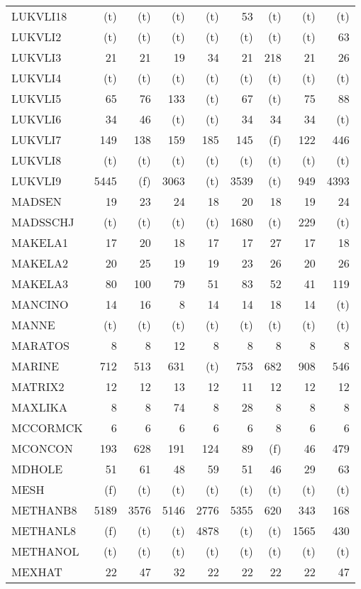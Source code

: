 \documentclass[11pt,twoside]{article}
\begin{document}
{\begin{longtable}[c]{|l|r|r|r|r|r|r|r|r|}
 LUKVLI18 & (t) & (t) & (t) & (t) & 53 & (t) & (t) & (t) \\
 LUKVLI2 & (t) & (t) & (t) & (t) & (t) & (t) & (t) & 63 \\
 LUKVLI3 & 21 & 21 & 19 & 34 & 21 & 218 & 21 & 26 \\
 LUKVLI4 & (t) & (t) & (t) & (t) & (t) & (t) & (t) & (t) \\
 LUKVLI5 & 65 & 76 & 133 & (t) & 67 & (t) & 75 & 88 \\
 LUKVLI6 & 34 & 46 & (t) & (t) & 34 & 34 & 34 & (t) \\
 LUKVLI7 & 149 & 138 & 159 & 185 & 145 & (f) & 122 & 446 \\
 LUKVLI8 & (t) & (t) & (t) & (t) & (t) & (t) & (t) & (t) \\
 LUKVLI9 & 5445 & (f) & 3063 & (t) & 3539 & (t) & 949 & 4393 \\
 MADSEN & 19 & 23 & 24 & 18 & 20 & 18 & 19 & 24 \\
 MADSSCHJ & (t) & (t) & (t) & (t) & 1680 & (t) & 229 & (t) \\
 MAKELA1 & 17 & 20 & 18 & 17 & 17 & 27 & 17 & 18 \\
 MAKELA2 & 20 & 25 & 19 & 19 & 23 & 26 & 20 & 26 \\
 MAKELA3 & 80 & 100 & 79 & 51 & 83 & 52 & 41 & 119 \\
 MANCINO & 14 & 16 & 8 & 14 & 14 & 18 & 14 & (t) \\
 MANNE & (t) & (t) & (t) & (t) & (t) & (t) & (t) & (t) \\
 MARATOS & 8 & 8 & 12 & 8 & 8 & 8 & 8 & 8 \\
 MARINE & 712 & 513 & 631 & (t) & 753 & 682 & 908 & 546 \\
 MATRIX2 & 12 & 12 & 13 & 12 & 11 & 12 & 12 & 12 \\
 MAXLIKA & 8 & 8 & 74 & 8 & 28 & 8 & 8 & 8 \\
 MCCORMCK & 6 & 6 & 6 & 6 & 6 & 8 & 6 & 6 \\
 MCONCON & 193 & 628 & 191 & 124 & 89 & (f) & 46 & 479 \\
 MDHOLE & 51 & 61 & 48 & 59 & 51 & 46 & 29 & 63 \\
 MESH & (f) & (t) & (t) & (t) & (t) & (t) & (t) & (t) \\
 METHANB8 & 5189 & 3576 & 5146 & 2776 & 5355 & 620 & 343 & 168 \\
 METHANL8 & (f) & (t) & (t) & 4878 & (t) & (t) & 1565 & 430 \\
 METHANOL & (t) & (t) & (t) & (t) & (t) & (t) & (t) & (t) \\
 MEXHAT & 22 & 47 & 32 & 22 & 22 & 22 & 22 & 47 \\

\end{longtable}}
\end{document}
